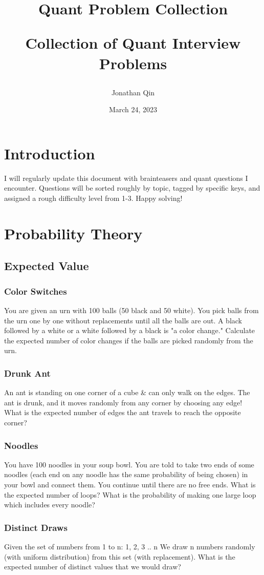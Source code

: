 \documentclass{article}
\title{

\begin{center} \textbf{Quant Problem Collection}

Collection of Quant Interview Problems \end{center}
}
\author{Jonathan Qin}
\date{March 24, 2023}
\begin{document}
\maketitle

\section{Introduction}
I will regularly update this document with brainteasers and quant questions I encounter. Questions will be sorted roughly by topic, tagged by specific keys, and assigned a rough difficulty level from 1-3. Happy solving!

\section{Probability Theory}
\subsection{Expected Value}
\subsubsection{Color Switches}
You are given an urn with 100 balls (50 black and 50 white). You pick balls from the urn one by one without replacements until all the balls are out. A black followed by a white or a white followed by a black is "a color change." Calculate the expected number of color changes if the balls are picked randomly from the urn.
\subsubsection{Drunk Ant}
An ant is standing on one corner of a cube & can only walk on the edges. The ant is drunk, and it moves randomly from any corner by choosing any edge! What is the expected number of edges the ant travels to reach the opposite corner?
\subsubsection{Noodles}
You have 100 noodles in your soup bowl. You are told to take two ends of some noodles (each end on any noodle has the same probability of being chosen) in your bowl and connect them. You continue until there are no free ends. What is the expected number of loops? What is the probability of making one large loop which includes every noodle?
\subsubsection{Distinct Draws}
Given the set of numbers from 1 to n: { 1, 2, 3 .. n } We draw n numbers randomly (with uniform distribution) from this set (with replacement). What is the expected number of distinct values that we would draw?
\end{document}
